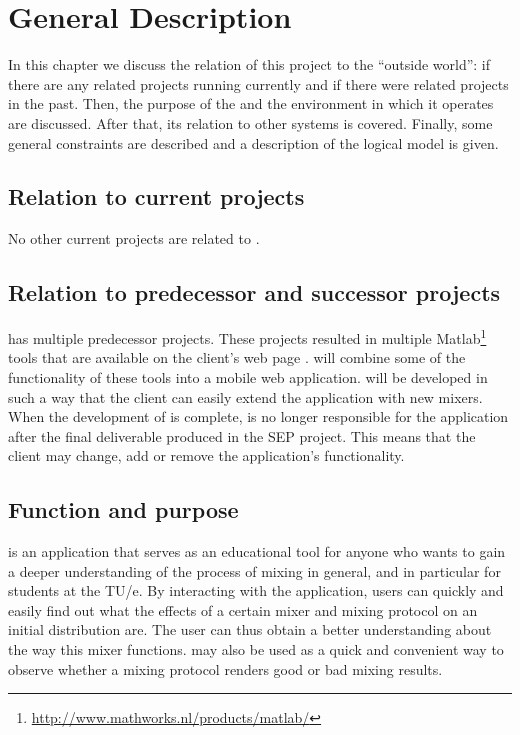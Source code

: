 \chapter{General Description}
\label{chap:gendesc}
In this chapter we discuss the relation of this project to the ``outside world'': if there are any related projects running currently and if there were related projects in the past. Then, the purpose of the \applicationname{} and the environment in which it operates are discussed. After that, its relation to other systems is covered. Finally, some general constraints are described and a description of the logical model is given.

\section{Relation to current projects}
\label{sec:curproj}
No other current projects are related to \projectname{}.

\section{Relation to predecessor and successor projects}
\label{sec:predsuc}
\projectname{} has multiple predecessor projects. These projects resulted in multiple Matlab\footnote{\url{http://www.mathworks.nl/products/matlab/}} tools that are available on the client's web page \cite{clientpage}. \projectname{} will combine some of the functionality of these tools into a mobile web application. \projectname{} will be developed in such a way that the client can easily extend the application with new mixers. When the development of \projectname{} is complete, \projectname{} is no longer responsible for the application after the final deliverable produced in the SEP project. This means that the client may change, add or remove the application's functionality.

\section{Function and purpose}
\label{sec:functpurp}
\projectname{} is an application that serves as an educational tool for anyone who wants to gain a deeper understanding of the process of mixing in general, and in particular for students at the TU/e. By interacting with the application, users can quickly and easily find out what the effects of a certain mixer and mixing protocol on an initial distribution are. The user can thus obtain a better understanding about the way this mixer functions. \projectname{} may also be used as a quick and convenient way to observe whether a mixing protocol renders good or bad mixing results. 

